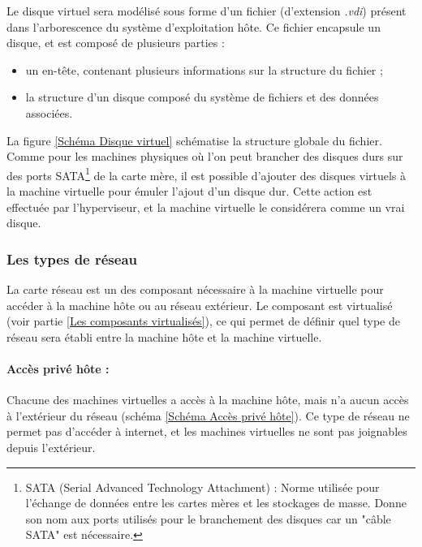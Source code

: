 Le disque virtuel sera modélisé sous forme d'un fichier (d'extension \textit{.vdi}) présent dans l'arborescence du système d'exploitation hôte.
Ce fichier encapsule un disque, et est composé de plusieurs parties :
\begin{itemize}
	\item un en-tête, contenant plusieurs informations sur la structure du fichier ;
	\item la structure d'un disque composé du système de fichiers et des données associées.
\end{itemize}
La figure \ref{Schéma Disque virtuel} schématise la structure globale du fichier.
\\


Comme pour les machines physiques où l'on peut brancher des disques durs sur des ports SATA\footnote{SATA (Serial Advanced Technology Attachment) : Norme utilisée pour l'échange de données entre les cartes mères et les stockages de masse. Donne son nom aux ports utilisés pour le branchement des disques car un "câble SATA" est nécessaire.} de la carte mère, il est possible d'ajouter des disques virtuels à la machine virtuelle pour émuler l'ajout d'un disque dur.
Cette action est effectuée par l'hyperviseur, et la machine virtuelle le considérera comme un vrai disque.
\\




\subsubsection{Les types de réseau}
\label{Les types de réseau}

La carte réseau est un des composant nécessaire à la machine virtuelle pour accéder à la machine hôte ou au réseau extérieur.
Le composant est virtualisé (voir partie \ref{Les composants virtualisés}), ce qui permet de définir quel type de réseau sera établi entre la machine hôte et la machine virtuelle.
\\


\paragraph{Accès privé hôte :}

Chacune des machines virtuelles a accès à la machine hôte, mais n'a aucun accès à l'extérieur du réseau (schéma \ref{Schéma Accès privé hôte}).
Ce type de réseau ne permet pas d'accéder à internet, et les machines virtuelles ne sont pas joignables depuis l'extérieur.

